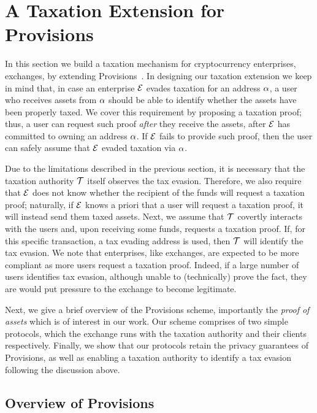 \section{A Taxation Extension for Provisions}\label{sec:provisions-extension}

In this section we build a taxation mechanism for cryptocurrency enterprises,
\eg exchanges, by extending Provisions~\cite{CCS:DBBCB15}. In designing our
taxation extension we keep in mind that, in case an enterprise $\mathcal{E}$
evades taxation for an address $\alpha$, a user who receives assets from
$\alpha$ should be able to identify whether the assets have been properly
taxed. We cover this requirement by proposing a taxation proof; thus, a user
can request such proof \emph{after} they receive the assets, \ie after
$\mathcal{E}$ has committed to owning an address $\alpha$. If $\mathcal{E}$ fails
to provide such proof, then the user can safely assume that $\mathcal{E}$ evaded
taxation via $\alpha$.

Due to the limitations described in the previous section, it is necessary that
the taxation authority $\mathcal{T}$ itself observes the tax evasion. Therefore,
we also require that $\mathcal{E}$ does not know whether the recipient of the
funds will request a taxation proof; naturally, if $\mathcal{E}$ knows a priori
that a user will request a taxation proof, it will instead send them taxed
assets. Next, we assume that $\mathcal{T}$ covertly interacts with the users and,
upon receiving some funds, requests a taxation proof. If, for this specific
transaction, a tax evading address is used, then $\mathcal{T}$ will identify the
tax evasion. We note that enterprises, like exchanges, are expected to be more
compliant as more users request a taxation proof. Indeed, if a large number of
users identifies tax evasion, although unable to (technically) prove the fact,
they are would put pressure to the exchange to become legitimate.

Next, we give a brief overview of the Provisions scheme, importantly the
\emph{proof of assets} which is of interest in our work. Our scheme comprises
of two simple protocols, which the exchange runs with the taxation authority
and their clients respectively. Finally, we show that our protocols retain the
privacy guarantees of Provisions, as well as enabling a taxation authority to
identify a tax evasion following the discussion above.

\subsection{Overview of Provisions}\label{subsec:provisions-overview}

